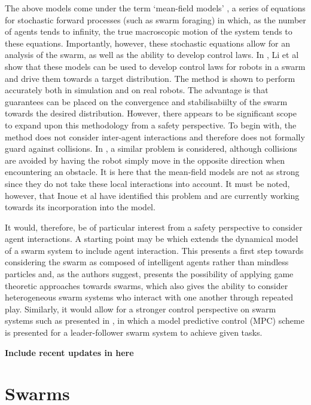 \documentclass[.../main.tex]{subfiles}
\begin{document}
The above models come under the term ‘mean-field models’ \cite{Elamvazhuthi2019b}, a series of
equations
for stochastic forward processes (such as swarm foraging) in which, as the number of agents tends to
infinity, the true macroscopic motion of the system tends to these equations. Importantly, however,
these stochastic equations allow for an analysis of the swarm, as well as the ability to develop
control laws. In \cite{Li2017}, Li et al show that these models can be used to develop control
laws for robots in a swarm and drive them towards a target distribution. The method is shown to
perform accurately both in simulation and on real robots. The advantage is that guarantees can be
placed on the convergence and stabilisabiilty of the swarm towards the desired distribution.
However, there appears to be significant scope to expand upon this methodology from a safety
perspective. To begin with, the method does not consider inter-agent interactions and therefore does
not formally guard against collisions. In \cite{Inoue2019}, a similar problem is considered,
although collisions are avoided by having the robot simply move in the opposite direction when
encountering an obstacle. It is here that the mean-field models are not as strong since they do not
take these local interactions into account. It must be noted, however, that Inoue et al have
identified this problem and are currently working towards its incorporation into the model.

It would, therefore, be of particular interest from a safety perspective to consider agent
interactions. A starting point may be \cite{Bellomo2017} which extends the dynamical model of a
swarm system to include agent interaction. This presents a first step towards considering the swarm
as composed of intelligent agents rather than mindless particles and, as the authors suggest,
presents the possibility of applying game theoretic approaches towards swarms, which also gives the
ability to consider heterogeneous swarm systems who interact with one another through repeated play.
Similarly, it would allow for a stronger control perspective on swarm systems such as presented in
\cite{Borzi2015}, in which a model predictive control (MPC) scheme is presented for a
leader-follower swarm system to achieve given tasks. 

\textbf{Include recent updates in here}

\section{Swarms} \label{sec::Swarms}
\end{document}
